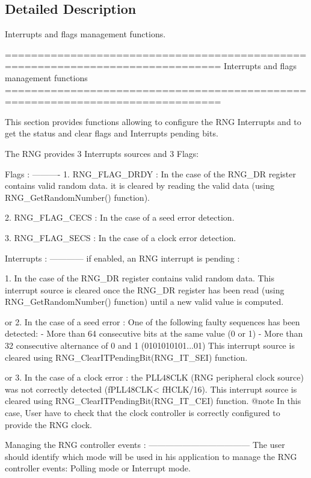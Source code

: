 \subsection{Detailed Description}
Interrupts and flags management functions. \begin{DoxyVerb} ===============================================================================
                   Interrupts and flags management functions
 ===============================================================================  

  This section provides functions allowing to configure the RNG Interrupts and 
  to get the status and clear flags and Interrupts pending bits.
  
  The RNG provides 3 Interrupts sources and 3 Flags:
  
  Flags :
  ---------- 
     1. RNG_FLAG_DRDY :  In the case of the RNG_DR register contains valid 
                         random data. it is cleared by reading the valid data 
                         (using RNG_GetRandomNumber() function).

     2. RNG_FLAG_CECS : In the case of a seed error detection. 
      
     3. RNG_FLAG_SECS : In the case of a clock error detection.
              

  Interrupts :
  ------------
   if enabled, an RNG interrupt is pending :
    
   1.  In the case of the RNG_DR register contains valid random data. 
       This interrupt source is cleared once the RNG_DR register has been read 
       (using RNG_GetRandomNumber() function) until a new valid value is 
       computed. 
   
   or 
   2. In the case of a seed error : One of the following faulty sequences has 
      been detected:
      - More than 64 consecutive bits at the same value (0 or 1)
      - More than 32 consecutive alternance of 0 and 1 (0101010101...01)
      This interrupt source is cleared using RNG_ClearITPendingBit(RNG_IT_SEI)
      function.
   
   or
   3. In the case of a clock error : the PLL48CLK (RNG peripheral clock source) 
      was not correctly detected (fPLL48CLK< fHCLK/16).
      This interrupt source is cleared using RNG_ClearITPendingBit(RNG_IT_CEI)
      function.
      @note In this case, User have to check that the clock controller is 
            correctly configured to provide the RNG clock. 

  Managing the RNG controller events :
  ------------------------------------ 
  The user should identify which mode will be used in his application to manage 
  the RNG controller events: Polling mode or Interrupt mode.
  

\end{DoxyVerb}
